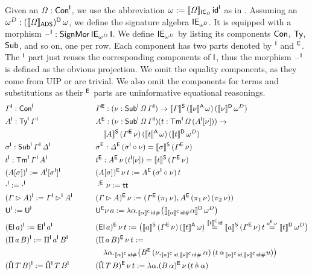 \documentclass[a4paper,UKenglish,cleveref, autoref]{lipics-v2019}
\begin{document}
\begin{definition}
  Given an $\mathit{\Omega}:\mathsf{Con}^{\mathsf{I}}$, we use the abbreviation
  $\omega := \llbracket\mathit{\Omega}\rrbracket_{\mathsf{IC}_{\mathit{\Omega}}}\,\mathsf{id}^{\mathsf{I}}$ as in
  . Assuming an
  $\omega^D : (\llbracket\mathit{\Omega}\rrbracket_{\mathsf{ADS}})^{\mathsf{D}}\,\omega$, we define the
  signature algebra $\mathsf{IE}_{\omega^{\mathsf{D}}}$. It is equipped with a morphism
  $\mathord{\hspace{1pt}\text{--}\hspace{1pt}}^{\mathsf{I}} : \mathsf{SignMor}\,\mathsf{IE}_{\omega^D}\,\mathsf{I}$. We define
  $\mathsf{IE}_{\omega^D}$ by listing its components $\mathsf{Con}$, $\mathsf{Ty}$, $\mathsf{Sub}$,
  and so on, one per row. Each component has two parts denoted by
  $^{\mathsf{I}}$ and $^{\mathsf{E}}$. The $^{\mathsf{I}}$ part just reuses the corresponding
  components of $\mathsf{I}$, thus the morphism $\mathord{\hspace{1pt}\text{--}\hspace{1pt}}^{\mathsf{I}}$ is defined as the
  obvious projection. We omit the equality components, as they come
  from UIP or are trivial. We also omit the components for terms and
  substitutions as their $^{\mathsf{E}}$ parts are uninformative equational
  reasonings.
  \begin{alignat*}{10}
    & \GG^\I:\Con^\I && \hspace{1em} && \GG^\E:(\nu:\Sub^\I\,\GO\,\GG^\I)\ra \ll\GG\rr^\S\,(\ll\nu\rr^\A\,\omega)\,(\ll\nu\rr^\D\,\omega^D) \\
    & A^\I:\Ty^\I\,\GG^\I && && A^\E:(\nu:\Sub^\I\,\GO\,\GG^\I)(t:\Tm^\I\,\GO\,(A^\I[\nu]))\ra \\
    & && && \hspace{1em} \ll A\rr^\S\,(\GG^\E\,\nu)\,(\ll t\rr^\A\,\omega)\,(\ll t\rr^\D\,\omega^D) \\
    & \sigma^\I:\Sub^\I\,\GG^\I\,\GD^\I && && \sigma^\E:\GD^\E\,(\sigma^\I\circ\nu)=\ll\sigma\rr^\S\,(\GG^\E\,\nu) \\
    & t^\I:\Tm^\I\,\GG^\I\,A^\I && && t^\E : A^\E\,\nu\,(t^\I[\nu])= \ll t\rr^\S\,(\GG^\E\,\nu) \\
    & (A[\sigma])^\I := A^\I[\sigma^\I]^\I && && (A[\sigma])^\E\,\nu\,t := A^\E\,(\sigma^\I\circ\nu)\,t \\
    & \cdot^\I := \cdot^\I && && \cdot^\E\,\nu := \tt \\
    & (\GG\rhd A)^\I := \GG^\I\rhd^\I A^\I && && (\GG\rhd A)^\E\,\nu := (\GG^\E\,(\pi_1\,\nu), A^\E\,(\pi_1\,\nu)\,(\pi_2\,\nu)) \\
    & \U^\I := \U^\I && && \U^\E\nu\,a := \lambda\alpha . _{\ll\alpha\rr^\C\,\id\#}\big(\ll_{\ll\alpha\rr^\C\,\id\#}\alpha\rr^\D\,\omega^D\big) \\
    & (\El\,a)^\I := \El^\I\,a^\I && && (\El\,a)^\E\,\nu\,t := \big(\ll a\rr^\S\,(\GG^\E\,\nu)\,(\ll t\rr^\A\,\omega) \overset{\ll t\rr^\C\,\id}{=} \ll a\rr^\S\,(\GG^\E\,\nu)\,t \overset{a^\E\,\nu}{=} \ll t\rr^\D\,\omega^D\big) \\
    & (\Pi\,a\,B)^\I := \Pi^\I\,a^\I\,B^\I && && (\Pi\,a\,B)^\E\,\nu\,t := \\
    & && && \hspace{1em} \lambda\alpha.{_{\ll\alpha\rr^\C\,\id\#}}\big(B^\E\,(\nu,_{\ll a\rr^\C\,\id,\ll\nu\rr^\C\,\id\#}\alpha)\,(t\oldapp {_{\ll a\rr^\C\,\id,\ll\nu\rr^\C\,\id\#}u})\big) \\
    & (\Pim\,T\,B)^\I := \Pim^\I\,T\,B^\I && && (\Pim\,T\,B)^\E\,\nu\,t := \lambda\alpha.(B\,\alpha)^\E\,\nu\,(t\appm\alpha)
  \end{alignat*}
\end{definition}
\end{document}
